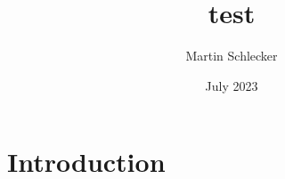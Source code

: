 \documentclass{article}
\title{test}
\author{Martin Schlecker}
\date{July 2023}
\begin{document}
\maketitle

\section{Introduction}
\end{document}

